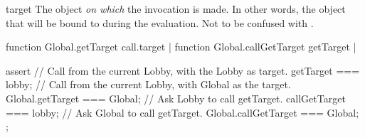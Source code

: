 \begin{urbiscriptapi}
\item[target]%
  The object \emph{on which} the invocation is made.  In other words, the
  object that will be bound to \this during the evaluation.  Not to be
  confused with .
\begin{urbiscript}
function Global.getTarget { call.target } |
function Global.callGetTarget { getTarget } |

assert
{
  // Call from the current Lobby, with the Lobby as target.
  getTarget === lobby;
  // Call from the current Lobby, with Global as the target.
  Global.getTarget === Global;
  // Ask Lobby to call getTarget.
  callGetTarget === lobby;
  // Ask Global to call getTarget.
  Global.callGetTarget === Global;
};
\end{urbiscript}
\end{urbiscriptapi}


